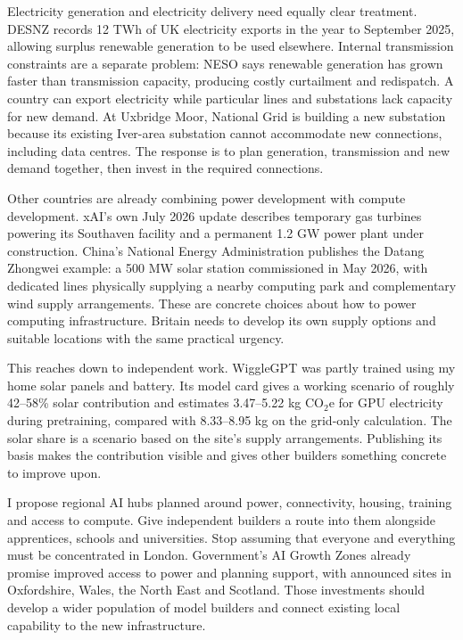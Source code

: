 \documentclass[11pt,a4paper]{article}
\begin{document}
Electricity generation and electricity delivery need equally clear treatment. DESNZ records 12 TWh of UK electricity exports in the year to September 2025, allowing surplus renewable generation to be used elsewhere. Internal transmission constraints are a separate problem: NESO says renewable generation has grown faster than transmission capacity, producing costly curtailment and redispatch. A country can export electricity while particular lines and substations lack capacity for new demand. At Uxbridge Moor, National Grid is building a new substation because its existing Iver-area substation cannot accommodate new connections, including data centres. The response is to plan generation, transmission and new demand together, then invest in the required connections. \cite{infraInterconnection,infraNESOConstraints,infraUxbridge}

Other countries are already combining power development with compute development. xAI's own July 2026 update describes temporary gas turbines powering its Southaven facility and a permanent 1.2 GW power plant under construction. China's National Energy Administration publishes the Datang Zhongwei example: a 500 MW solar station commissioned in May 2026, with dedicated lines physically supplying a nearby computing park and complementary wind supply arrangements. These are concrete choices about how to power computing infrastructure. Britain needs to develop its own supply options and suitable locations with the same practical urgency. \cite{infraXAITurbines,infraDatangDirect}

This reaches down to independent work. WiggleGPT was partly trained using my home solar panels and battery. Its model card gives a working scenario of roughly 42--58\% solar contribution and estimates 3.47--5.22 kg CO$_2$e for GPU electricity during pretraining, compared with 8.33--8.95 kg on the grid-only calculation. The solar share is a scenario based on the site's supply arrangements. Publishing its basis makes the contribution visible and gives other builders something concrete to improve upon. \cite{wigglecard}

I propose regional AI hubs planned around power, connectivity, housing, training and access to compute. Give independent builders a route into them alongside apprentices, schools and universities. Stop assuming that everyone and everything must be concentrated in London. Government's AI Growth Zones already promise improved access to power and planning support, with announced sites in Oxfordshire, Wales, the North East and Scotland. Those investments should develop a wider population of model builders and connect existing local capability to the new infrastructure. \cite{infraAIGrowthZones}
\end{document}

